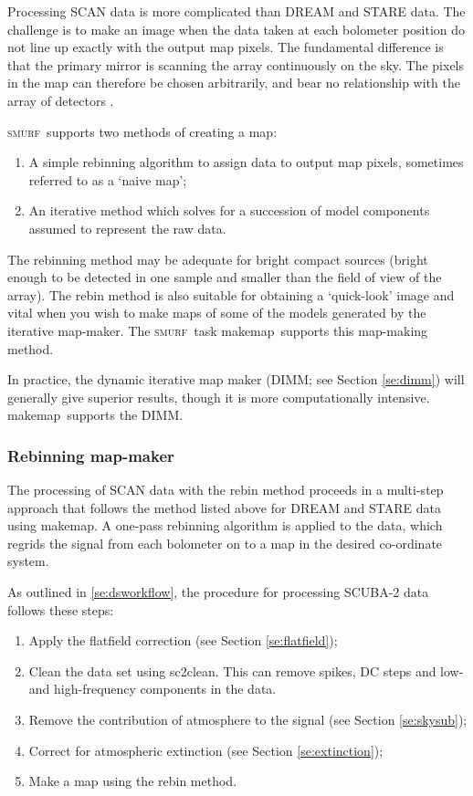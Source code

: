 \documentclass[twoside,11pt]{article}
\newcommand{\xref}[3]{#1}
\newcommand{\xlabel}[1]{}
\renewcommand{\_}{\texttt{\symbol{95}}}
\newcommand{\SMURF}{\textsc{smurf}}
\newcommand{\task}[1]{\textsf{#1}}
\newcommand{\makemap}{\xref{\task{makemap}}{sun258}{MAKEMAP}}
\newcommand{\clean}{\xref{\task{sc2clean}}{sun258}{SC2CLEAN}}
\begin{document}
Processing SCAN data is more complicated than DREAM and STARE data.
The challenge is to make an image when the data taken at each
bolometer position do not line up exactly with the output map
pixels. The fundamental difference is that the primary mirror is
scanning the array continuously on the sky. The pixels in the map can
therefore be chosen arbitrarily, and bear no relationship with the
array of detectors \cite{sc2ana001,sc2ana005,sc2ana006}.

\SMURF\ supports two methods of creating a map:
\begin{enumerate}
\item A simple rebinning algorithm to assign data to output map
  pixels, sometimes referred to as a `naive map';
\item An iterative method which solves for a succession of model
  components assumed to represent the raw data.
\end{enumerate}

The rebinning method may be adequate for bright compact sources
(bright enough to be detected in one sample and smaller than the field
of view of the array). The rebin method is also suitable for obtaining
a `quick-look' image and vital when you wish to make maps of some of
the models generated by the iterative map-maker. The \SMURF\ task
\makemap\ supports this map-making method.

In practice, the dynamic iterative map maker (DIMM; see Section
\ref{se:dimm}) will generally give superior results, though it is more
computationally intensive. \makemap\ supports the DIMM.

\subsubsection{\xlabel{rebin}Rebinning map-maker\label{se:rebin}}

The processing of SCAN data with the rebin method proceeds in a
multi-step approach that follows the method listed above for DREAM and
STARE data using \makemap. A one-pass rebinning algorithm is applied
to the data, which regrids the signal from each bolometer on to a map
in the desired co-ordinate system.

As outlined in \ref{se:dsworkflow}, the procedure for processing
SCUBA-2 data follows these steps:
\begin{enumerate}
\item Apply the flatfield correction (see Section \ref{se:flatfield});
\item Clean the data set using \clean. This can remove spikes, DC
  steps and low- and high-frequency components in the data.
\item Remove the contribution of atmosphere to the signal (see Section
  \ref{se:skysub});
\item Correct for atmospheric extinction (see Section
  \ref{se:extinction});
\item Make a map using the rebin method.
\end{enumerate}
\end{document}
